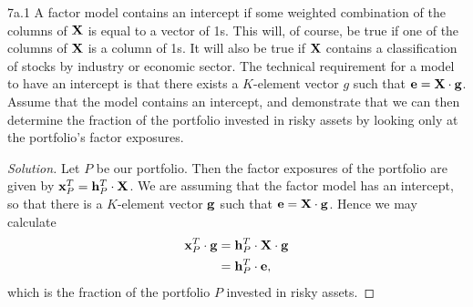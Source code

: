
\begin{problem}{7a.1}
A factor model contains an intercept if some weighted combination of the columns of $\mathbf{X}$ is equal to a vector of 1s. This will, of course, be true if one of the columns of $\mathbf{X}$ is a column of 1s. It will also be true if $\mathbf{X}$ contains a classification of stocks by industry or economic sector. The technical requirement for a model to have an intercept is that there exists a $K$-element vector $g$ such that $\mathbf{e} = \mathbf{X}
\cdot \mathbf{g}$. Assume that the model contains an intercept, and demonstrate that we can then determine the fraction of the portfolio invested in risky assets by looking only at the portfolio's factor exposures.
\end{problem}
\begin{proof}[Solution]
Let $P$ be our portfolio. Then the factor exposures of the portfolio are given by $\mathbf{x}_{P}^{T} = \mathbf{h}_{P}^{T} \cdot \mathbf{X}$. We are assuming that the factor model has an intercept, so that there is a $K$-element vector $\mathbf{g}$ such that $\mathbf{e} = \mathbf{X} \cdot \mathbf{g}$. Hence we may calculate
\begin{align*}
\mathbf{x}_{P}^{T} \cdot \mathbf{g} &= \mathbf{h}_{P}^{T} \cdot \mathbf{X} \cdot \mathbf{g}\\
&= \mathbf{h}_{P}^{T} \cdot \mathbf{e},
\end{align*}
which is the fraction of the portfolio $P$ invested in risky assets.
\end{proof}

